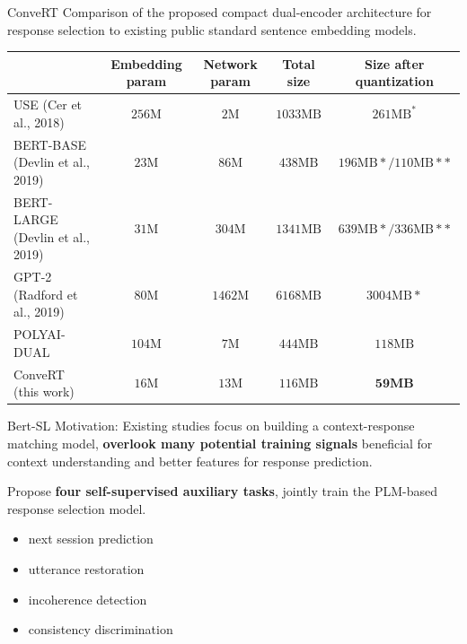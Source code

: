 \documentclass{beamer}
\begin{document}
\begin{frame}{ConveRT}
Comparison of the proposed compact dual-encoder architecture for response selection to existing public standard sentence embedding models.
\begin{center} \tiny

    \begin{tabular}{lcccc}
\hline & Embedding param & Network param & Total size & Size after quantization \\
\hline USE (Cer et al., 2018) & $256 \mathrm{M}$ & $2 \mathrm{M}$ & $1033 \mathrm{MB}$ & $261 \mathrm{MB}^{*}$ \\
BERT-BASE (Devlin et al., 2019) & $23 \mathrm{M}$ & $86 \mathrm{M}$ & $438 \mathrm{MB}$ & $196 \mathrm{MB} * / 110 \mathrm{MB} * *$ \\
BERT-LARGE (Devlin et al., 2019) & $31 \mathrm{M}$ & $304 \mathrm{M}$ & $1341 \mathrm{MB}$ & $639 \mathrm{MB} * / 336 \mathrm{MB} * *$ \\
GPT-2 (Radford et al., 2019) & $80 \mathrm{M}$ & $1462 \mathrm{M}$ & $6168 \mathrm{MB}$ & $3004 \mathrm{MB} *$ \\
POLYAI-DUAL & $104 \mathrm{M}$ & $7 \mathrm{M}$ & $444 \mathrm{MB}$ & $118 \mathrm{MB}$ \\
\hline ConveRT (this work) & $16 \mathrm{M}$ & $13 \mathrm{M}$ & $116 \mathrm{MB}$ & $\mathbf{5 9 M B}$ \\
\hline
\end{tabular}

\end{center}
\end{frame}

\begin{frame}{Bert-SL}
Motivation: Existing studies focus on building a context-response matching model, \textbf{overlook many potential training signals} beneficial for context understanding and better features for response prediction.

Propose \textbf{four self-supervised auxiliary tasks}, jointly train the PLM-based response selection model.
    \begin{itemize}
        \item next session prediction
        \item utterance restoration
        \item incoherence detection
        \item consistency discrimination
    \end{itemize}
\end{frame}
\end{document}
